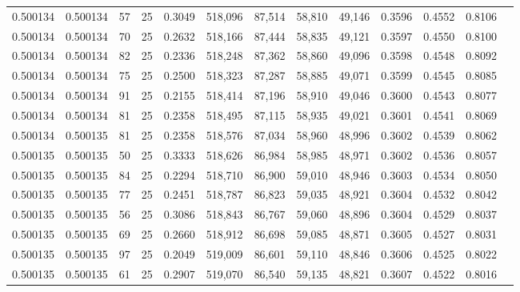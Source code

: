 \begin{tabular}{rrrrrrrrrrrrr}
0.500134 & 0.500134 &    57 &  25 &                                     0.3049 & 518,096 &  87,514 &  58,810 &  49,146 & 0.3596 & 0.4552 & 0.8106 \\
0.500134 & 0.500134 &    70 &  25 &                                     0.2632 & 518,166 &  87,444 &  58,835 &  49,121 & 0.3597 & 0.4550 & 0.8100 \\
0.500134 & 0.500134 &    82 &  25 &                                     0.2336 & 518,248 &  87,362 &  58,860 &  49,096 & 0.3598 & 0.4548 & 0.8092 \\
0.500134 & 0.500134 &    75 &  25 &                                     0.2500 & 518,323 &  87,287 &  58,885 &  49,071 & 0.3599 & 0.4545 & 0.8085 \\
0.500134 & 0.500134 &    91 &  25 &                                     0.2155 & 518,414 &  87,196 &  58,910 &  49,046 & 0.3600 & 0.4543 & 0.8077 \\
0.500134 & 0.500134 &    81 &  25 &                                     0.2358 & 518,495 &  87,115 &  58,935 &  49,021 & 0.3601 & 0.4541 & 0.8069 \\
0.500134 & 0.500135 &    81 &  25 &                                     0.2358 & 518,576 &  87,034 &  58,960 &  48,996 & 0.3602 & 0.4539 & 0.8062 \\
0.500135 & 0.500135 &    50 &  25 &                                     0.3333 & 518,626 &  86,984 &  58,985 &  48,971 & 0.3602 & 0.4536 & 0.8057 \\
0.500135 & 0.500135 &    84 &  25 &                                     0.2294 & 518,710 &  86,900 &  59,010 &  48,946 & 0.3603 & 0.4534 & 0.8050 \\
0.500135 & 0.500135 &    77 &  25 &                                     0.2451 & 518,787 &  86,823 &  59,035 &  48,921 & 0.3604 & 0.4532 & 0.8042 \\
0.500135 & 0.500135 &    56 &  25 &                                     0.3086 & 518,843 &  86,767 &  59,060 &  48,896 & 0.3604 & 0.4529 & 0.8037 \\
0.500135 & 0.500135 &    69 &  25 &                                     0.2660 & 518,912 &  86,698 &  59,085 &  48,871 & 0.3605 & 0.4527 & 0.8031 \\
0.500135 & 0.500135 &    97 &  25 &                                     0.2049 & 519,009 &  86,601 &  59,110 &  48,846 & 0.3606 & 0.4525 & 0.8022 \\
0.500135 & 0.500135 &    61 &  25 &                                     0.2907 & 519,070 &  86,540 &  59,135 &  48,821 & 0.3607 & 0.4522 & 0.8016 \\

\end{tabular}
